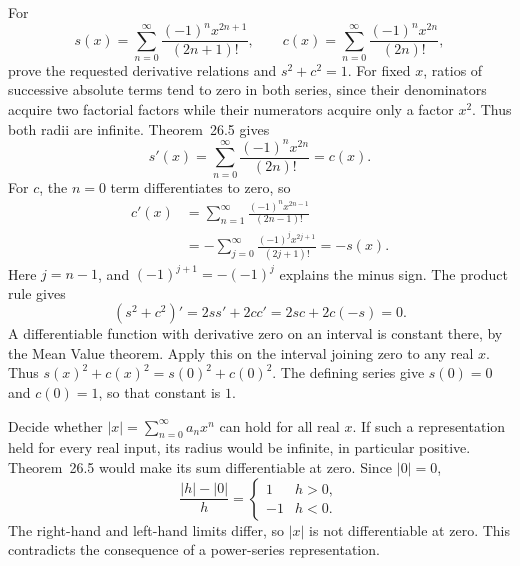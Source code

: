 \goal For
\[
 s(x)=\sum_{n=0}^\infty\frac{(-1)^n x^{2n+1}}{(2n+1)!},\qquad
 c(x)=\sum_{n=0}^\infty\frac{(-1)^n x^{2n}}{(2n)!},
\]
prove the requested derivative relations and $s^2+c^2=1$.
For fixed $x$, ratios of successive absolute terms tend to zero in both series,
since their denominators acquire two factorial factors while their numerators
acquire only a factor $x^2$. Thus both radii are infinite.
Theorem~26.5 gives
\[
 s'(x)=\sum_{n=0}^\infty\frac{(-1)^n x^{2n}}{(2n)!}=c(x).
\]
For $c$, the $n=0$ term differentiates to zero, so
\begin{align*}
 c'(x)&=\sum_{n=1}^\infty\frac{(-1)^n x^{2n-1}}{(2n-1)!}\\
 &=-\sum_{j=0}^\infty\frac{(-1)^j x^{2j+1}}{(2j+1)!}=-s(x).
\end{align*}
Here $j=n-1$, and $(-1)^{j+1}=-(-1)^j$ explains the minus sign.
The product rule gives
\[
 (s^2+c^2)'=2ss'+2cc'=2sc+2c(-s)=0.
\]
A differentiable function with derivative zero on an interval is constant
there, by the Mean Value theorem. Apply this on the interval joining zero to
any real $x$. Thus $s(x)^2+c(x)^2=s(0)^2+c(0)^2$.
The defining series give $s(0)=0$ and $c(0)=1$, so that constant is $1$.

\goal Decide whether $|x|=\sum_{n=0}^\infty a_nx^n$ can hold for all real $x$.
If such a representation held for every real input, its radius would be infinite,
in particular positive. Theorem~26.5 would make its sum differentiable at zero.
Since $|0|=0$,
\[
 \frac{|h|-|0|}{h}=\begin{cases}1&h>0,\\-1&h<0.\end{cases}
\]
The right-hand and left-hand limits differ, so $|x|$ is not differentiable at zero.
This contradicts the consequence of a power-series representation.

